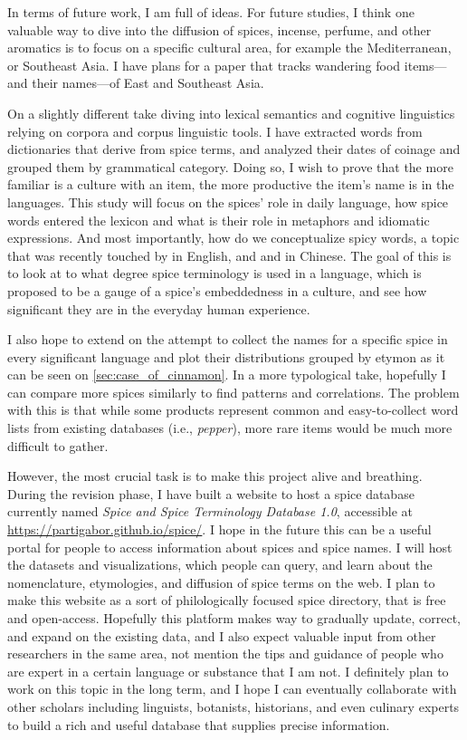 In terms of future work, I am full of ideas. For future studies, I think one valuable way to dive into the diffusion of spices, incense, perfume, and other aromatics is to focus on a specific cultural area, for example the Mediterranean, or Southeast Asia. I have plans for a paper that tracks wandering food items---and their names---of East and Southeast Asia. 


On a slightly different take diving into lexical semantics and cognitive linguistics relying on corpora and corpus linguistic tools. I have extracted words from dictionaries that derive from spice terms, and analyzed their dates of coinage and grouped them by grammatical category. Doing so, I wish to prove that the more familiar is a culture with an item, the more productive the item's name is in the languages. This study will focus on the spices' role in daily language, how spice words entered the lexicon and what is their role in metaphors and idiomatic expressions. And most importantly, how do we conceptualize spicy words, a topic that was recently touched by \textcite{bagli_tastes_2021} in English, and \textcite{dong_corpus-based_2018} and \textcite{zhong_bodily_2021} in Chinese. The goal of this is to  look at to what degree spice terminology is used in a language, which is proposed to be a gauge of a spice's embeddedness in a culture, and see how significant they are in the everyday human experience.

I also hope to extend on the attempt to collect the names for a specific spice in every significant language and plot their distributions grouped by etymon as it can be seen on \cref{sec:case_of_cinnamon}. In a more typological take, hopefully I can compare more spices similarly to find patterns and correlations. The problem with this is that while some products represent common and easy-to-collect word lists from existing databases (i.e., \textit{pepper}), more rare items would be much more difficult to gather. 

However, the most crucial task is to make this project alive and breathing. During the revision phase, I have built a website to host a spice database currently named \textit{Spice and Spice Terminology Database 1.0}, accessible at \url{https://partigabor.github.io/spice/}. I hope in the future this can be a useful portal for people to access information about spices and spice names. I will host the datasets and visualizations, which people can query, and learn about the nomenclature, etymologies, and diffusion of spice terms on the web. I plan to make this website as a sort of philologically focused spice directory, that is free and open-access. Hopefully this platform makes way to gradually update, correct, and expand on the existing data, and I also expect valuable input from other researchers in the same area, not mention the tips and guidance of people who are expert in a certain language or substance that I am not. I definitely plan to work on this topic in the long term, and I hope I can eventually collaborate with other scholars including linguists, botanists, historians, and even culinary experts to build a rich and useful database that supplies precise information.